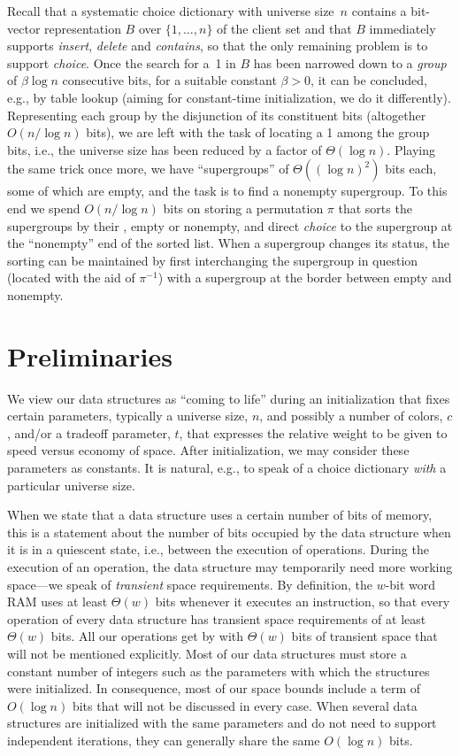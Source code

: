 \documentclass[envcountsame,envcountsect,undated,nolinenumbers]{lnthi}
\def\Tvn#1{\hbox{\textit{#1\/}}}
\begin{document}
Recall that a systematic choice dictionary with
universe size~$n$ contains a bit-vector representation
$B$ over $\{1,\ldots,n\}$ of the client set
and that $B$ immediately supports \Tvn{insert},
\Tvn{delete} and \Tvn{contains}, so that the only
remaining problem is to support \Tvn{choice}.
Once the search for a~1 in $B$ has been narrowed
down to a \emph{group} of $\beta\log n$ consecutive bits, for
a suitable constant $\beta>0$, it
can be concluded, e.g., by table lookup
(aiming for constant-time initialization,
we do it differently).
Representing each group by the disjunction of its
constituent bits (altogether
$O({n/{\log n}})$ bits),
we are left with the task of locating
a 1 among the group bits, i.e., the universe size
has been reduced by a factor of $\Theta(\log n)$.
Playing the same trick once more, we have
``supergroups'' of $\Theta((\log n)^2)$ bits each,
some of which are empty, and the task is to find
a nonempty supergroup.
To this end we spend $O({n/{\log n}})$ bits
on storing a permutation $\pi$ that sorts the
supergroups by their ,
empty or nonempty, and direct \Tvn{choice} to
the supergroup at the ``nonempty'' end of the sorted list.
When a supergroup changes its status, the sorting
can be maintained by first interchanging the
supergroup in question (located with the aid of $\pi^{-1}$)
with a supergroup at the border between
empty and nonempty.

\section{Preliminaries}
\label{sec:preliminaries}

We view our data structures as
``coming to life'' during an initialization that
fixes certain parameters, typically a
universe size, $n$, and possibly a number
of colors, $c$, and/or a tradeoff parameter, $t$,
that expresses the relative weight to be given
to speed versus economy of space.
After initialization, we may consider these
parameters as constants.
It is natural, e.g., to speak of a choice
dictionary \emph{with} a particular universe size.

When we state that a data structure uses a certain
number of bits of memory, this is a statement about
the number of bits occupied by the data structure
when it is in a quiescent state, i.e., between the
execution of operations.
During the execution of an operation, the data structure
may temporarily need more working space---we speak
of \emph{transient} space requirements.
By definition, the $w$-bit word RAM uses at least
$\Theta(w)$ bits whenever it executes an instruction,
so that every operation of every data structure
has transient space requirements of at least
$\Theta(w)$ bits.
All our operations
get by with $\Theta(w)$ bits of transient space
that will not be mentioned explicitly.
Most of our data structures must store a
constant number of integers such as the parameters
with which the structures were initialized.
In consequence, most of our space bounds include
a term of $O(\log n)$ bits that will not be
discussed in every case.
When several data structures are initialized with
the same parameters and do not need to support
independent iterations, they can generally share the
same $O(\log n)$ bits.
\end{document}

